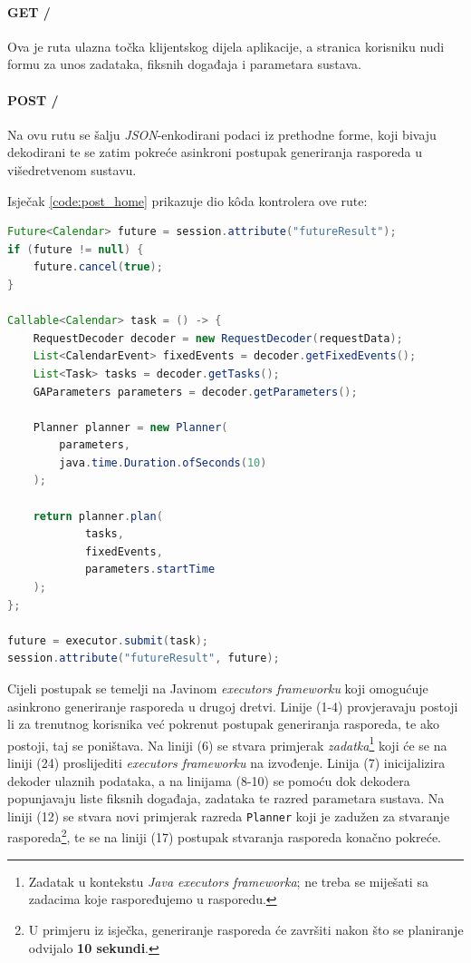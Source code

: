 \documentclass[times, utf8, zavrsni]{fer}
\begin{document}
\paragraph{GET /} Ova je ruta ulazna točka klijentskog dijela aplikacije, a stranica korisniku nudi formu za unos zadataka, fiksnih događaja i parametara sustava.

\paragraph{POST /} Na ovu rutu se šalju \textit{JSON}-enkodirani podaci iz prethodne forme, koji bivaju dekodirani te se zatim pokreće asinkroni postupak generiranja rasporeda u višedretvenom sustavu.

Isječak \ref{code:post_home} prikazuje dio k\^{o}da kontrolera ove rute:

\begin{lstlisting}[language=java, caption=Ruta \textbf{POST /}, label={code:post_home}, mathescape]
Future<Calendar> future = session.attribute("futureResult");
if (future != null) {
    future.cancel(true);
}

Callable<Calendar> task = () -> {
	RequestDecoder decoder = new RequestDecoder(requestData);
    List<CalendarEvent> fixedEvents = decoder.getFixedEvents();
    List<Task> tasks = decoder.getTasks();
    GAParameters parameters = decoder.getParameters();
    
    Planner planner = new Planner(
        parameters,
        java.time.Duration.ofSeconds(10)
    );

    return planner.plan(
            tasks,
            fixedEvents,
            parameters.startTime
    );
};

future = executor.submit(task);
session.attribute("futureResult", future);
\end{lstlisting}
Cijeli postupak se temelji na Javinom \textit{executors frameworku} koji omogućuje asinkrono generiranje rasporeda u drugoj dretvi. Linije (1-4) provjeravaju postoji li za trenutnog korisnika već pokrenut postupak generiranja rasporeda, te ako postoji, taj se poništava. Na liniji (6) se stvara primjerak \textit{zadatka}\footnote{Zadatak u kontekstu \textit{Java executors frameworka}; ne treba se miješati sa zadacima koje raspoređujemo u rasporedu.} koji će se na liniji (24) proslijediti \textit{executors frameworku} na izvođenje. Linija (7) inicijalizira dekoder ulaznih podataka, a na linijama (8-10) se pomoću dok dekodera popunjavaju liste fiksnih događaja, zadataka te razred parametara sustava. Na liniji (12) se stvara novi primjerak razreda \texttt{Planner} koji je zadužen za stvaranje rasporeda\footnote{U primjeru iz isječka, generiranje rasporeda će završiti nakon što se planiranje odvijalo \textbf{10 sekundi}.}, te se na liniji (17) postupak stvaranja rasporeda konačno pokreće.
\end{document}
